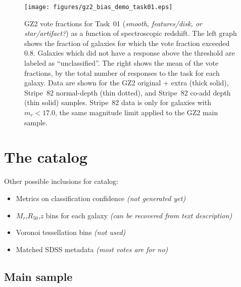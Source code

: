 \documentclass[useAMS,usenatbib]{mn2e}
\newcommand{\mr}{$M_r$}
\newcommand{\rfifty}{$R_{50}$}
\begin{document}
\begin{figure}
\texttt{[image: figures/gz2\_bias\_demo\_task01.eps]}
\caption{GZ2 vote fractions for Task~01 ({\it smooth, features/disk, or star/artifact?}) as a function of spectroscopic redshift. The left graph shows the fraction of galaxies for which the vote fraction exceeded 0.8. Galaxies which did not have a response above the threshold are labeled as ``unclassified''. The right shows the mean of the vote fractions, by the total number of responses to the task for each galaxy. Data are shown for the GZ2 original + extra (thick solid), Stripe~82 normal-depth (thin dotted), and Stripe~82 co-add depth (thin solid) samples. Stripe~82 data is only for galaxies with $m_r < 17.0$, the same magnitude limit applied to the GZ2 main sample.  
\label{fig-task01}}
\end{figure}


\section{The catalog} \label{sec-catalog}

Other possible inclusions for catalog:
\begin{itemize}
	\item Metrics on classification confidence \citep[Table 04,][]{lin11} {\it (not generated yet)}
	\item \mr,\rfifty,$z$ bins for each galaxy {\it (can be recovered from text description)}
	\item Voronoi tessellation bins {\it (not used)}
	\item Matched SDSS metadata {\it (most votes are for no)}
\end{itemize}

\subsection{Main sample}\label{ssec-catalog_main}
\end{document}
